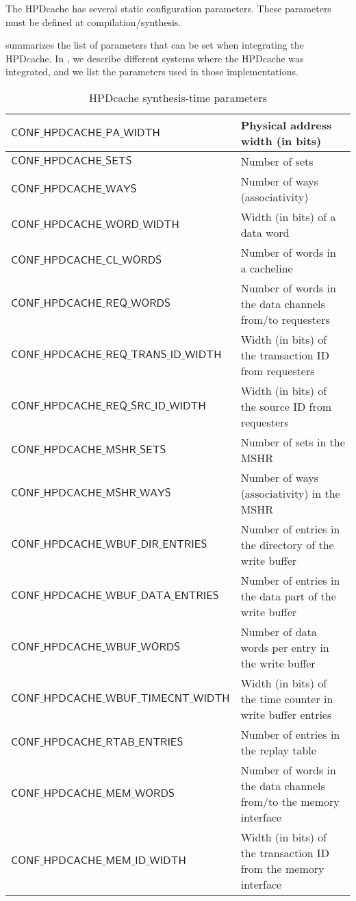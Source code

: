 \documentclass[10pt,titlepage,twoside]{book}
\begin{document}
The \ac{HPDcache} has several static configuration parameters.
These parameters must be defined at compilation/synthesis.

 summarizes the list of parameters that can be set when integrating the \ac{HPDcache}.
In , we describe different systems where the \ac{HPDcache} was integrated, and we list the parameters used in those implementations.

\begin{table}[h!]
\begin{center}
\caption{HPDcache synthesis-time parameters}%
{\footnotesize%
\begin{tabular}{p{}p{}}
\toprule%
$\mathsf{CONF\_HPDCACHE\_PA\_WIDTH}$ &%
Physical address width (in bits) \\
\midrule%
$\mathsf{CONF\_HPDCACHE\_SETS}$ &%
Number of sets \\
\midrule%
$\mathsf{CONF\_HPDCACHE\_WAYS}$ &%
Number of ways (associativity) \\
\midrule%
$\mathsf{CONF\_HPDCACHE\_WORD\_WIDTH}$ &%
Width (in bits) of a data word\\
\midrule%
$\mathsf{CONF\_HPDCACHE\_CL\_WORDS}$ &%
Number of words in a cacheline\\
\midrule%
$\mathsf{CONF\_HPDCACHE\_REQ\_WORDS}$ &%
Number of words in the data channels from/to requesters \\
\midrule%
$\mathsf{CONF\_HPDCACHE\_REQ\_TRANS\_ID\_WIDTH}$ &%
Width (in bits) of the transaction ID from requesters \\
\midrule%
$\mathsf{CONF\_HPDCACHE\_REQ\_SRC\_ID\_WIDTH}$ &%
Width (in bits) of the source ID from requesters \\
\midrule%
$\mathsf{CONF\_HPDCACHE\_MSHR\_SETS}$ &%
Number of sets in the \ac{MSHR} \\
\midrule%
$\mathsf{CONF\_HPDCACHE\_MSHR\_WAYS}$ &%
Number of ways (associativity) in the \ac{MSHR} \\
\midrule%
$\mathsf{CONF\_HPDCACHE\_WBUF\_DIR\_ENTRIES}$ &%
Number of entries in the directory of the write buffer \\
\midrule%
$\mathsf{CONF\_HPDCACHE\_WBUF\_DATA\_ENTRIES}$ &%
Number of entries in the data part of the write buffer \\
\midrule%
$\mathsf{CONF\_HPDCACHE\_WBUF\_WORDS}$ &%
Number of data words per entry in the write buffer \\
\midrule%
$\mathsf{CONF\_HPDCACHE\_WBUF\_TIMECNT\_WIDTH}$ &%
Width (in bits) of the time counter in write buffer entries \\
\midrule%
$\mathsf{CONF\_HPDCACHE\_RTAB\_ENTRIES}$ &%
Number of entries in the replay table \\
\midrule%
$\mathsf{CONF\_HPDCACHE\_MEM\_WORDS}$ &%
Number of words in the data channels from/to the memory interface \\
\midrule%
$\mathsf{CONF\_HPDCACHE\_MEM\_ID\_WIDTH}$ &%
Width (in bits) of the transaction ID from the memory interface \\
\end{tabular}}
\end{center}
\end{table}
\end{document}
